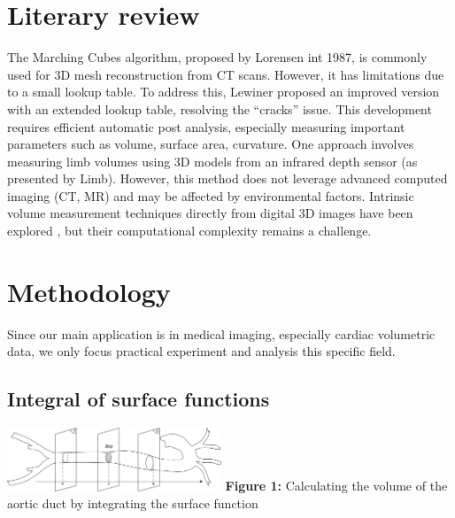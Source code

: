 \documentclass[11pt]{article}
\begin{document}
\begin{multicols}{2}
\section{Literary review}
The Marching Cubes algorithm, proposed by Lorensen int 1987, is commonly used for 3D mesh reconstruction from CT scans. However, it has limitations due to a small lookup table. To address this, Lewiner \cite{lewiner}proposed an improved version with an extended lookup table, resolving the “cracks” issue. This development requires efficient automatic post analysis, especially measuring important parameters such as volume, surface area, curvature. One approach \cite{limb} involves measuring limb volumes using 3D models from an infrared depth sensor (as presented by Limb). However, this method does not leverage advanced computed imaging (CT, MR) and may be affected by environmental factors. Intrinsic volume measurement techniques directly from digital 3D images have been explored \cite{intrinsic}, but their computational complexity remains a challenge. 

\section{Methodology}
Since our main application is in medical imaging, especially cardiac volumetric data, we only focus practical experiment and analysis this specific field. 

\subsection{Integral of surface functions}

\includegraphics[width=0.48\textwidth]{Figures/Integral Surface Function.png}
\textbf{Figure 1:} Calculating the volume of the aortic duct by integrating the surface function \\


\end{multicols}
\end{document}
